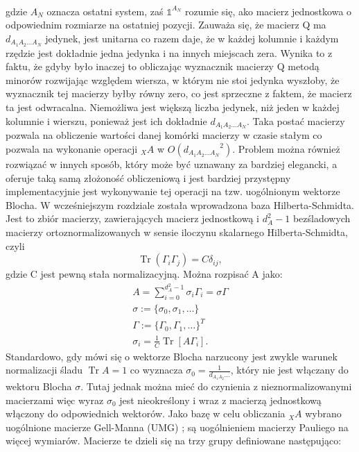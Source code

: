 \documentclass[10pt]{article} %
\DeclareMathOperator{\Trs}{Tr}
\newcommand{\I}{\mathbb{1}}
\begin{document}
\begin{appendices}
\begin{gather}
\end{gather} gdzie $A_N$ oznacza ostatni system, zaś $\I^{A_N}$ rozumie się,  ako macierz jednostkowa o odpowiednim rozmiarze na ostatniej pozycji. Zauważa się, że macierz Q ma $d_{A_1 A_2 \dots A_N}$ jedynek, jest unitarna co razem daje, że w każdej kolumnie i każdym rzędzie jest dokładnie jedna jedynka i na innych miejscach zera. Wynika to z faktu, że gdyby było inaczej to obliczając wyznacznik macierzy Q metodą minorów rozwijając względem wiersza, w którym nie stoi jedynka wyszłoby, że wyznacznik tej macierzy byłby równy zero, co jest sprzeczne z faktem, że macierz ta jest odwracalna. Niemożliwa jest większą liczba jedynek, niż jeden w każdej kolumnie i wierszu, ponieważ jest ich dokładnie $d_{A_1A_2\dots A_N}$. Taka postać macierzy pozwala na obliczenie wartości danej komórki macierzy w czasie stałym co pozwala na wykonanie operacji ${}_XA$ w $O({d_{A_1 A_2 \dots A_N}}^2)$. Problem można również rozwiązać w innych sposób, który może być uznawany za bardziej elegancki, a oferuje taką samą złożoność obliczeniową i jest bardziej przystępny implementacyjnie jest wykonywanie tej operacji na tzw. uogólnionym wektorze Blocha. W wcześniejszym rozdziale została wprowadzona baza Hilberta-Schmidta. Jest to zbiór macierzy, zawierających macierz jednostkową i $d_A^2-1$ bezśladowych macierzy ortoznormalizowanych w sensie iloczynu skalarnego Hilberta-Schmidta, czyli
\begin{equation}
\Trs \left( \Gamma_i \Gamma_j \right) = C\delta_{ij},
\end{equation} gdzie C jest pewną stała normalizacyjną.
Można rozpisać A jako:
\begin{gather}
A = \sum_{i=0}^{d^2_A-1} \sigma_i \Gamma_i = \mathbb{\sigma} \Gamma \\
\mathbb{\sigma} := \{ \sigma_0, \sigma_1, \dots \} \\
\Gamma := \{ \Gamma_0, \Gamma_1, \dots \}^T \\
\sigma_i = \frac{1}{C} \Trs \left[ A \Gamma_i \right].
\end{gather} Standardowo, gdy mówi się o wektorze Blocha narzucony jest zwykle warunek normalizacji śladu $\Trs A = 1$ co wyznacza $\sigma_0 = \frac{1}{d_{A_1A_2} \dots}$, który nie jest włączany do wektoru Blocha $\mathbb{\sigma}$. Tutaj jednak można mieć do czynienia z nieznormalizowanymi macierzami więc
wyraz $\sigma_0$ jest nieokreślony i wraz z macierzą jednostkową włączony do odpowiednich wektorów. Jako bazę w celu obliczania ${}_XA$ wybrano uogólnione macierze Gell-Manna (UMG) \cite{gell_mann}; są uogólnieniem macierzy Pauliego na więcej wymiarów. Macierze te dzieli się na trzy grupy definiowane następująco:

\end{appendices}
\end{document}
